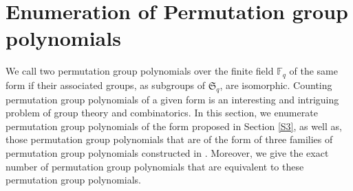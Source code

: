 \documentclass[11pt]{amsart}
\theoremstyle{plain}
\numberwithin{equation}{section}
\def\F{{\mathbb F}}
\begin{document}
\section{Enumeration of Permutation group polynomials}\label{S4}
 We call two permutation group polynomials over the finite field $\F_q$ of the same form if their associated groups, as subgroups of $\mathfrak{S}_q$, are isomorphic. Counting permutation group polynomials of a given form is an interesting and intriguing problem of group theory and combinatorics. In this section, we enumerate permutation group polynomials of the form proposed in Section \ref{S3}, as well as, those permutation group polynomials  that are of the form of three families of permutation group polynomials constructed in \cite{HK}. Moreover, we give the exact number of permutation group polynomials that are equivalent to these permutation group polynomials. %
 
\end{document}
